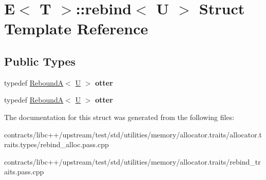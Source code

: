 \hypertarget{struct_e_1_1rebind}{}\section{E$<$ T $>$\+:\+:rebind$<$ U $>$ Struct Template Reference}
\label{struct_e_1_1rebind}
\subsection*{Public Types}
\begin{DoxyCompactItemize}
\item 
\mbox{\label{struct_e_1_1rebind_a2c41ff3e3038462a01cd848b31b28b06}} 
typedef \mbox{\hyperlink{struct_rebound_a}{ReboundA}}$<$ \mbox{\hyperlink{union_u}{U}} $>$ {\bfseries otter}
\item 
\mbox{\label{struct_e_1_1rebind_a2c41ff3e3038462a01cd848b31b28b06}} 
typedef \mbox{\hyperlink{struct_rebound_a}{ReboundA}}$<$ \mbox{\hyperlink{union_u}{U}} $>$ {\bfseries otter}
\end{DoxyCompactItemize}


The documentation for this struct was generated from the following files\+:\begin{DoxyCompactItemize}
\item 
contracts/libc++/upstream/test/std/utilities/memory/allocator.\+traits/allocator.\+traits.\+types/rebind\+\_\+alloc.\+pass.\+cpp\item 
contracts/libc++/upstream/test/std/utilities/memory/allocator.\+traits/rebind\+\_\+traits.\+pass.\+cpp\end{DoxyCompactItemize}
